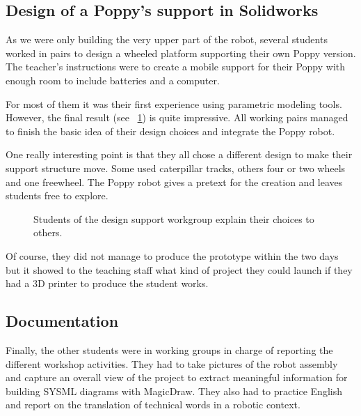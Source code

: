 \subsection{Design of a Poppy's support in Solidworks} %

As we were only building the very upper part of the robot, several students worked in pairs to design a wheeled platform supporting their own Poppy version. The teacher’s instructions were to create a mobile support for their Poppy with enough room to include batteries and a computer.

For most of them it was their first experience using parametric modeling tools. However, the final result (see \figurename~\ref{fig:saintonge_support}) is quite impressive. All working pairs managed to finish the basic idea of their design choices and integrate the Poppy robot.

One really interesting point is that they all chose a different design to make their support structure move. Some used caterpillar tracks, others four or two wheels and one freewheel. The Poppy robot gives a pretext for the creation and leaves students free to explore.

\begin{figure}[tb]
\centering
    \hfill
    \hfill
    \caption{Students of the design support workgroup explain their choices to others.}
    \label{fig:saintonge_support}
\end{figure}

Of course,  they did not manage to produce the prototype within the two days but it showed to the teaching staff what kind of project they could launch if they had a 3D printer to produce the student works.

\subsection{Documentation } %

Finally, the other students were in working groups in charge of reporting the different workshop activities. They had to take pictures of the robot assembly and capture an overall view of the project to extract meaningful information for building SYSML diagrams with MagicDraw. They also had to practice English and report on the translation of technical words in a robotic context.

